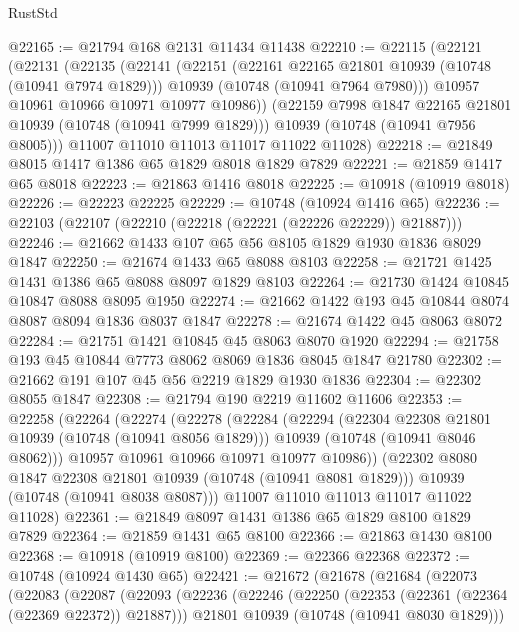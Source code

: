 \begin{lexlean}{RustStd}
\begin{coremodule}
@22165 := @21794 @168 @2131 @11434 @11438
@22210 := @22115
    (@22121
      (@22131
        (@22135
          (@22141
            (@22151
              (@22161 @22165 @21801 @10939 (@10748 (@10941 @7974 @1829)))
              @10939
              (@10748 (@10941 @7964 @7980)))
            @10957
            @10961
            @10966
            @10971
            @10977
            @10986))
        (@22159 @7998 @1847 @22165 @21801 @10939 (@10748 (@10941 @7999 @1829)))
        @10939
        (@10748 (@10941 @7956 @8005)))
      @11007
      @11010
      @11013
      @11017
      @11022
      @11028)
@22218 := @21849 @8015 @1417 @1386 @65 @1829 @8018 @1829 @7829
@22221 := @21859 @1417 @65 @8018
@22223 := @21863 @1416 @8018
@22225 := @10918 (@10919 @8018)
@22226 := @22223 @22225
@22229 := @10748 (@10924 @1416 @65)
@22236 := @22103 (@22107 (@22210 (@22218 (@22221 (@22226 @22229)) @21887)))
@22246 := @21662 @1433 @107 @65 @56 @8105 @1829 @1930 @1836 @8029 @1847
@22250 := @21674 @1433 @65 @8088 @8103
@22258 := @21721 @1425 @1431 @1386 @65 @8088 @8097 @1829 @8103
@22264 := @21730 @1424 @10845 @10847 @8088 @8095 @1950
@22274 := @21662 @1422 @193 @45 @10844 @8074 @8087 @8094 @1836 @8037 @1847
@22278 := @21674 @1422 @45 @8063 @8072
@22284 := @21751 @1421 @10845 @45 @8063 @8070 @1920
@22294 := @21758 @193 @45 @10844 @7773 @8062 @8069 @1836 @8045 @1847 @21780
@22302 := @21662 @191 @107 @45 @56 @2219 @1829 @1930 @1836
@22304 := @22302 @8055 @1847
@22308 := @21794 @190 @2219 @11602 @11606
@22353 := @22258
    (@22264
      (@22274
        (@22278
          (@22284
            (@22294
              (@22304 @22308 @21801 @10939 (@10748 (@10941 @8056 @1829)))
              @10939
              (@10748 (@10941 @8046 @8062)))
            @10957
            @10961
            @10966
            @10971
            @10977
            @10986))
        (@22302 @8080 @1847 @22308 @21801 @10939 (@10748 (@10941 @8081 @1829)))
        @10939
        (@10748 (@10941 @8038 @8087)))
      @11007
      @11010
      @11013
      @11017
      @11022
      @11028)
@22361 := @21849 @8097 @1431 @1386 @65 @1829 @8100 @1829 @7829
@22364 := @21859 @1431 @65 @8100
@22366 := @21863 @1430 @8100
@22368 := @10918 (@10919 @8100)
@22369 := @22366 @22368
@22372 := @10748 (@10924 @1430 @65)
@22421 := @21672
    (@21678
      (@21684
        (@22073
          (@22083
            (@22087
              (@22093
                (@22236
                  (@22246
                    (@22250 (@22353 (@22361 (@22364 (@22369 @22372)) @21887)))
                    @21801
                    @10939
                    (@10748 (@10941 @8030 @1829)))

\end{coremodule}
\end{lexlean}
